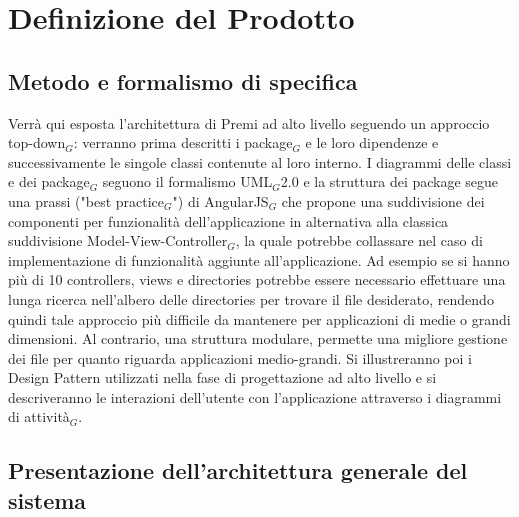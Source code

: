 \newpage
\section{Definizione del Prodotto}

\subsection{Metodo e formalismo di specifica}
Verrà qui esposta l'architettura di Premi ad alto livello seguendo un approccio top-down$_G$: verranno prima descritti i package$_G$ e le loro dipendenze e successivamente le singole classi contenute al loro interno. I diagrammi delle classi e dei package$_G$ seguono il formalismo UML$_G$2.0 e la struttura dei package segue una prassi ("best practice$_G$") di AngularJS$_G$ che propone una suddivisione dei componenti per funzionalità dell'applicazione in alternativa alla classica suddivisione Model-View-Controller$_G$, la quale potrebbe collassare nel caso di implementazione di funzionalità aggiunte all'applicazione. Ad esempio se si hanno più di 10 controllers, views e directories potrebbe essere necessario effettuare una lunga ricerca nell'albero delle directories per trovare il file desiderato, rendendo quindi tale approccio più difficile da mantenere per applicazioni di medie o grandi dimensioni. Al contrario, una struttura modulare, permette una migliore gestione dei file per quanto riguarda applicazioni medio-grandi.
Si illustreranno poi i Design Pattern utilizzati nella fase di progettazione ad alto livello e si descriveranno le interazioni dell'utente con l'applicazione attraverso i diagrammi di attività$_G$.


\subsection{Presentazione dell'architettura generale del sistema}

